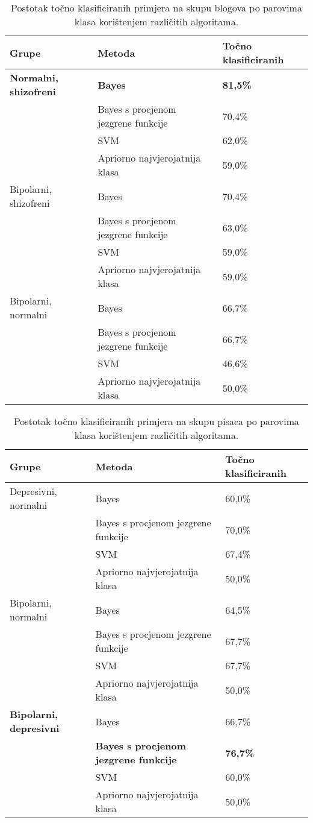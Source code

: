 \documentclass[10pt, a4paper]{article}
\begin{document}
\begin{table*}
\caption{Postotak točno klasificiranih primjera na skupu blogova po parovima klasa korištenjem različitih algoritama.}
\label{lab:rezultatiBlogGrupa}
\begin{center}
\begin{tabular}{lll}
\toprule
Grupe & Metoda & Točno klasificiranih\\
\midrule
\textbf{Normalni, shizofreni} & \textbf{Bayes} & \textbf{81,5\%}\\
 & Bayes s procjenom jezgrene funkcije & 70,4\%\\
 & SVM & 62,0\%\\
 & Apriorno najvjerojatnija klasa & 59,0\%\\
\midrule
 Bipolarni, shizofreni &  Bayes &  70,4\%\\
 & Bayes s procjenom jezgrene funkcije & 63,0\%\\
 & SVM & 59,0\%\\
 & Apriorno najvjerojatnija klasa & 59,0\%\\
\midrule
Bipolarni, normalni & Bayes & 66,7\%\\
 & Bayes s procjenom jezgrene funkcije & 66,7\%\\
 & SVM & 46,6\%\\
 & Apriorno najvjerojatnija klasa & 50,0\%\\
 \bottomrule
 \end{tabular}
 \end{center}
 \end{table*}


\begin{table*}
\caption{Postotak točno klasificiranih primjera na skupu pisaca po parovima klasa korištenjem različitih algoritama.}
\label{tab:rezultPisciGrupa}
\begin{center}
\begin{tabular}{lll}
\toprule
Grupe & Metoda & Točno klasificiranih\\
\midrule
Depresivni, normalni & Bayes & 60,0\%\\
 & Bayes s procjenom jezgrene funkcije & 70,0\%\\
 & SVM & 67,4\%\\
  & Apriorno najvjerojatnija klasa & 50,0\%\\
\midrule
Bipolarni, normalni & Bayes & 64,5\%\\
 & Bayes s procjenom jezgrene funkcije & 67,7\%\\
 & SVM & 67,7\%\\
  & Apriorno najvjerojatnija klasa & 50,0\%\\
\midrule
 \textbf{Bipolarni, depresivni} &  Bayes &  66,7\%\\
 &  \textbf{Bayes s procjenom jezgrene funkcije} &  \textbf{76,7\%}\\
  & SVM & 60,0\%\\
   & Apriorno najvjerojatnija klasa & 50,0\%\\
\bottomrule
\end{tabular}
\end{center}
\end{table*}
\end{document}
